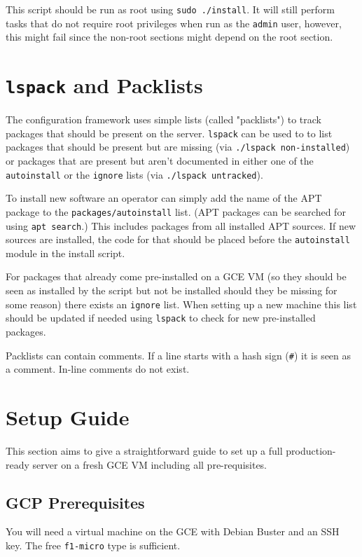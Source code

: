 \documentclass[12pt,a4paper]{report}
\begin{document}
	This script should be run as root using \lstinline|sudo ./install|. It will still perform tasks that do not require root privileges when run as the \lstinline|admin| user, however, this might fail since the non-root sections might depend on the root section.

	\section{\lstinline|lspack| and Packlists}
	The configuration framework uses simple lists (called "packlists") to track packages that should be present on the server. \lstinline|lspack| can be used to to list packages that should be present but are missing (via \lstinline|./lspack non-installed|) or packages that are present but aren't documented in either one of the \lstinline|autoinstall| or the \lstinline|ignore| lists (via \lstinline|./lspack untracked|).

	To install new software an operator can simply add the name of the APT package to the \lstinline|packages/autoinstall| list. (APT packages can be searched for using \lstinline|apt search|.) This includes packages from all installed APT sources. If new sources are installed, the code for that should be placed before the \lstinline|autoinstall| module in the install script.

	For packages that already come pre-installed on a GCE VM (so they should be seen as installed by the script but not be installed should they be missing for some reason) there exists an \lstinline|ignore| list. When setting up a new machine this list should be updated if needed using \lstinline|lspack| to check for new pre-installed packages.

	Packlists can contain comments. If a line starts with a hash sign (\lstinline|#|) it is seen as a comment. In-line comments do not exist.

	\pagebreak
	\section{Setup Guide}
	This section aims to give a straightforward guide to set up a full production-ready server on a fresh GCE VM including all pre-requisites.

	\subsection{GCP Prerequisites}
	You will need a virtual machine on the GCE with Debian Buster and an SSH key. The free \lstinline|f1-micro| type is sufficient.
\end{document}
